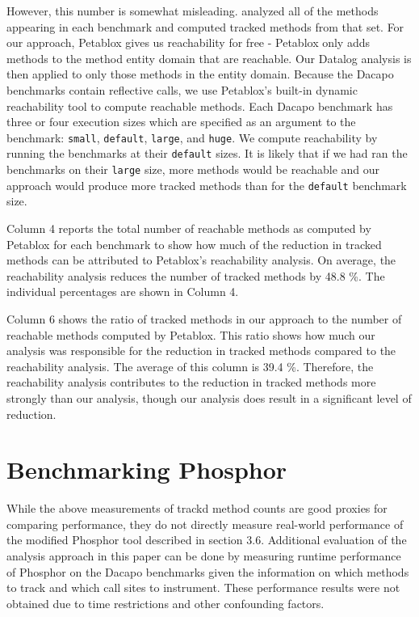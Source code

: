 However, this number is somewhat misleading. \cite{manoj_project} analyzed all of the methods appearing in each benchmark and computed tracked methods from that set. For our approach, Petablox gives us reachability for free - Petablox only adds methods to the method entity domain that are reachable. Our Datalog analysis is then applied to only those methods in the entity domain. Because the Dacapo benchmarks contain reflective calls, we use Petablox's built-in dynamic reachability tool to compute reachable methods. Each Dacapo benchmark has three or four execution sizes which are specified as an argument to the benchmark: \texttt{small}, \texttt{default}, \texttt{large}, and \texttt{huge}. We compute reachability by running the benchmarks at their \texttt{default} sizes. It is likely that if we had ran the benchmarks on their \texttt{large} size, more methods would be reachable and our approach would produce more tracked methods than for the \texttt{default} benchmark size.

Column 4 reports the total number of reachable methods as computed by Petablox for each   benchmark to show how much of the reduction in tracked methods can be attributed to Petablox's reachability analysis. On average, the reachability analysis reduces the number of tracked methods by 48.8 \%. The individual percentages are shown in Column 4.

Column 6 shows the ratio of tracked methods in our approach to the number of reachable methods computed by Petablox. This ratio shows how much our analysis was responsible for the reduction in tracked methods compared to the reachability analysis. The average of this column is 39.4 \%. Therefore, the reachability analysis contributes to the reduction in tracked methods more strongly than our analysis, though our analysis does result in a significant level of reduction.

\section{Benchmarking Phosphor}
While the above measurements of trackd method counts are good proxies for comparing performance, they do not directly measure real-world performance of the modified Phosphor tool described in section 3.6. Additional evaluation of the analysis approach in this paper can be done by measuring runtime performance of Phosphor on the Dacapo benchmarks given the information on which methods to track and which call sites to instrument. These performance results were not obtained due to time restrictions and other confounding factors.
